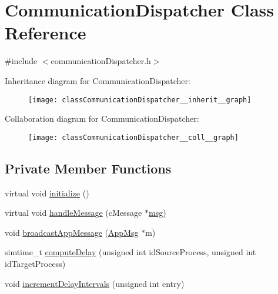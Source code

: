\hypertarget{classCommunicationDispatcher}{}\section{Communication\+Dispatcher Class Reference}
\label{classCommunicationDispatcher}


{\ttfamily \#include $<$communication\+Dispatcher.\+h$>$}



Inheritance diagram for Communication\+Dispatcher\+:\nopagebreak
\begin{figure}[H]
\begin{center}
\leavevmode
\texttt{[image: classCommunicationDispatcher\_\_inherit\_\_graph]}
\end{center}
\end{figure}


Collaboration diagram for Communication\+Dispatcher\+:\nopagebreak
\begin{figure}[H]
\begin{center}
\leavevmode
\texttt{[image: classCommunicationDispatcher\_\_coll\_\_graph]}
\end{center}
\end{figure}
\subsection*{Private Member Functions}
\begin{DoxyCompactItemize}
\item 
virtual void \hyperlink{classCommunicationDispatcher_ab44887658841bb5ab59c554c1738c8f3}{initialize} ()
\item 
virtual void \hyperlink{classCommunicationDispatcher_af7be3dbf46282e78d41d3d194f5ff246}{handle\+Message} (c\+Message $\ast$\hyperlink{Controller_8h_afa0f3b802fbc219228f7bb97996fa558}{msg})
\item 
void \hyperlink{classCommunicationDispatcher_a589821f510801091f753f9812e3d1ee7}{broadcast\+App\+Message} (\hyperlink{classAppMsg}{App\+Msg} $\ast$m)
\item 
simtime\+\_\+t \hyperlink{classCommunicationDispatcher_acf6f743d35e72c71d61275ad25cdc306}{compute\+Delay} (unsigned int id\+Source\+Process, unsigned int id\+Target\+Process)
\item 
void \hyperlink{classCommunicationDispatcher_ab87c3d69a5953f9bda369d53c2de90d7}{increment\+Delay\+Intervals} (unsigned int entry)
\end{DoxyCompactItemize}
